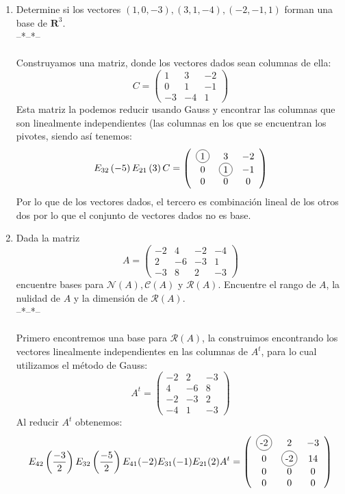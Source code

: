 \documentclass[letter]{memoir} %
\newcommand\Circle[1]{%
  \tikz[baseline=(char.base)]\node[circle,draw,inner sep=2pt] (char) {#1};}
\begin{document}
\begin{enumerate}
\item Determine si los vectores $(1,0,-3),(3,1,-4),(-2,-1,1)$ forman una base de $\mathbf{R}^3.$\\
--*--*--\\\\
Construyamos una matriz, donde los vectores dados sean columnas de ella: 
	\[
			C= \left( 
            \begin{array}{ccc}
            1 & 3 & -2 \\
            0 & 1 &-1 \\
            -3 & -4 &1 
         	\end{array}
					\right)
		\]
Esta matriz la podemos reducir usando Gauss y encontrar las columnas que son linealmente independientes (las columnas en los que se encuentran los pivotes, siendo así tenemos: 
	\[
    		E_{32}\left(-5\right) E_{21}\left( 3\right)C = 
			 \left( 
            \begin{array}{ccc}
            \Circle{1} & 3 & -2 \\
            0 & \Circle{1} &-1 \\
            0 & 0 & 0 
         	\end{array}
					\right)
		\]
Por lo que de los vectores dados, el tercero es combinación lineal de los otros dos por lo que el conjunto de vectores dados no es base.\\

\item Dada la matriz
	\[
			A= \left( 
            \begin{array}{cccc}
            -2 & 4 & -2 & -4 \\
            2  & -6 & -3 & 1 \\
            -3 & 8& 2 & -3
         	\end{array}
					\right)
		\]
encuentre bases para $\mathcal{N}(A), \mathcal{C}(A)$ y $\mathcal{R}(A)$. Encuentre el rango de $A$, la nulidad de $A$ y la dimensión de $\mathcal{R}(A)$.\\
--*--*--\\\\
Primero encontremos una base para $\mathcal{R}(A)$, la construimos encontrando los vectores linealmente independientes en las columnas de $A^t$, para lo cual utilizamos el método de Gauss:
\[
	A^t = \left( 
            \begin{array}{ccc}
            -2 & 2& -3\\
            4 & -6 & 8\\
            -2 & -3 & 2\\
            -4 & 1 & -3
            \end{array}
		\right)
\]
Al reducir $A^t$ obtenemos:\\
\[
	E_{42}\left( \frac{-3}{2} \right) E_{32}\left( \frac{-5}{2}\right) E_{41}(-2) E_{31}(-1) E_{21}(2) A^t = \left( 
            \begin{array}{ccc}
            \Circle{-2} & 2& -3\\
            0 & \Circle{-2} & 14\\
            0 & 0 & 0\\
            0 & 0 & 0
            \end{array}
		\right)
\]


\end{enumerate}
\end{document}
